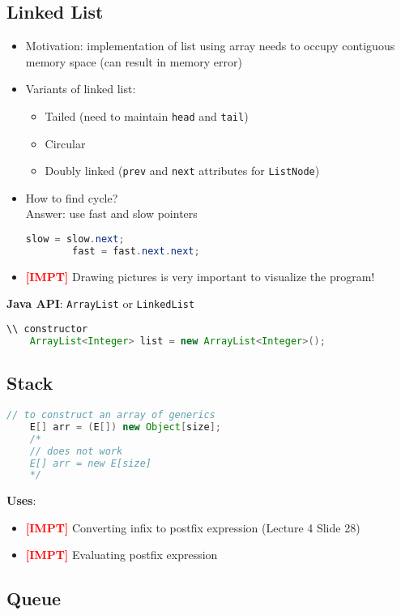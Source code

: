 \documentclass{article}
\newcommand{\impt}[0]{\textcolor{red}{\textbf{[IMPT] }}}
\begin{document}
\begin{multicols}{2}
\subsection{Linked List}
\begin{itemize}
	\item Motivation: implementation of list using array needs to occupy contiguous memory space (can result in memory error)
	\item Variants of linked list:
	\begin{itemize}
		\item Tailed (need to maintain \texttt{head} and \texttt{tail})
		\item Circular
		\item Doubly linked (\texttt{prev} and \texttt{next} attributes for \texttt{ListNode})
	\end{itemize}
	\item How to find cycle?\\
	Answer: use fast and slow pointers
	\begin{lstlisting}[language=java]
		slow = slow.next;
		fast = fast.next.next;\end{lstlisting}
	\item \impt Drawing pictures is very important to visualize the program!
\end{itemize}

\textbf{Java API}: \texttt{ArrayList} or \texttt{LinkedList}
\begin{lstlisting}[language=Java]
	\\ constructor
	ArrayList<Integer> list = new ArrayList<Integer>();
\end{lstlisting}

\subsection{Stack}
\begin{lstlisting}[language=Java]
	// to construct an array of generics
	E[] arr = (E[]) new Object[size];
	/*
	// does not work
	E[] arr = new E[size]
	*/
\end{lstlisting}
\textbf{Uses}:
\begin{itemize}
	\item \impt Converting infix to postfix expression (Lecture 4 Slide 28)
	\item \impt Evaluating postfix expression
\end{itemize}

\subsection{Queue}


\end{multicols}
\end{document}
